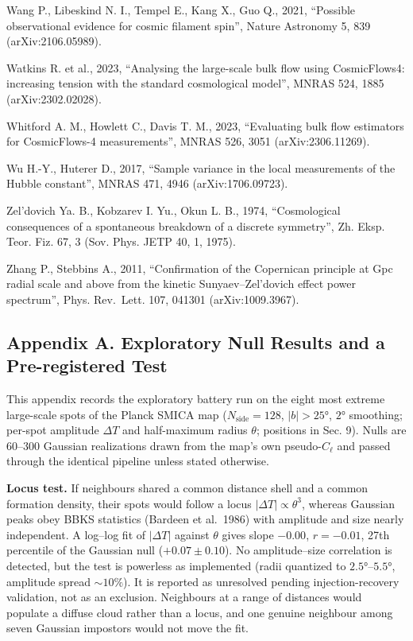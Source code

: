 \documentclass[
]{article}
\begin{document}
Wang P., Libeskind N. I., Tempel E., Kang X., Guo Q., 2021, ``Possible
observational evidence for cosmic filament spin'', Nature Astronomy 5,
839 (arXiv:2106.05989).

Watkins R. et al., 2023, ``Analysing the large-scale bulk flow using
CosmicFlows4: increasing tension with the standard cosmological model'',
MNRAS 524, 1885 (arXiv:2302.02028).

Whitford A. M., Howlett C., Davis T. M., 2023, ``Evaluating bulk flow
estimators for CosmicFlows-4 measurements'', MNRAS 526, 3051
(arXiv:2306.11269).

Wu H.-Y., Huterer D., 2017, ``Sample variance in the local measurements
of the Hubble constant'', MNRAS 471, 4946 (arXiv:1706.09723).

Zel'dovich Ya. B., Kobzarev I. Yu., Okun L. B., 1974, ``Cosmological
consequences of a spontaneous breakdown of a discrete symmetry'', Zh.
Eksp. Teor. Fiz. 67, 3 (Sov. Phys. JETP 40, 1, 1975).

Zhang P., Stebbins A., 2011, ``Confirmation of the Copernican principle
at Gpc radial scale and above from the kinetic Sunyaev--Zel'dovich
effect power spectrum'', Phys. Rev.~Lett. 107, 041301 (arXiv:1009.3967).

\hypertarget{appendix-a.-exploratory-null-results-and-a-pre-registered-test}{%
\subsection{\texorpdfstring{\textbf{Appendix A. Exploratory Null Results
and a Pre-registered
Test}}{Appendix A. Exploratory Null Results and a Pre-registered Test}}\label{appendix-a.-exploratory-null-results-and-a-pre-registered-test}}

This appendix records the exploratory battery run on the eight most
extreme large-scale spots of the Planck SMICA map
(\(N_{\text{side}} = 128\), \(|b| > 25°\), \(2°\) smoothing; per-spot
amplitude \(\Delta T\) and half-maximum radius \(\theta\); positions in
Sec. 9). Nulls are 60--300 Gaussian realizations drawn from the map's
own pseudo-\(C_\ell\) and passed through the identical pipeline unless
stated otherwise.

\textbf{Locus test.} If neighbours shared a common distance shell and a
common formation density, their spots would follow a locus
\(|\Delta T| \propto \theta^3\), whereas Gaussian peaks obey BBKS
statistics (Bardeen et al.~1986) with amplitude and size nearly
independent. A log--log fit of \(|\Delta T|\) against \(\theta\) gives
slope \(-0.00\), \(r = -0.01\), 27th percentile of the Gaussian null
(\(+0.07 \pm 0.10\)). No amplitude--size correlation is detected, but
the test is powerless as implemented (radii quantized to
\(2.5°\)--\(5.5°\), amplitude spread \(\sim\!10\%\)). It is reported as
unresolved pending injection-recovery validation, not as an exclusion.
Neighbours at a range of distances would populate a diffuse cloud rather
than a locus, and one genuine neighbour among seven Gaussian impostors
would not move the fit.
\end{document}
